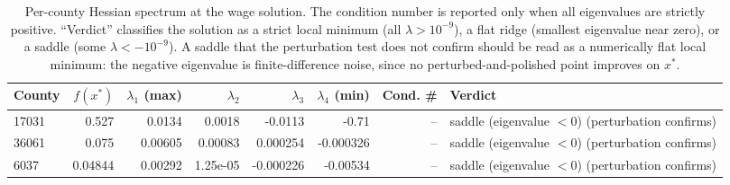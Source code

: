 \begin{table}[ht]
\centering
\caption{Per-county Hessian spectrum at the wage solution. The condition number is reported only when all eigenvalues are strictly positive. ``Verdict'' classifies the solution as a strict local minimum (all $\lambda > 10^{-9}$), a flat ridge (smallest eigenvalue near zero), or a saddle (some $\lambda < -10^{-9}$). A saddle that the perturbation test does not confirm should be read as a numerically flat local minimum: the negative eigenvalue is finite-difference noise, since no perturbed-and-polished point improves on $x^*$.} 
\label{tab:wage_hessian_spectrum}
\begin{tabular}{lrrrrrrl}
  \toprule
County & $f(x^*)$ & $\lambda_1$ (max) & $\lambda_2$ & $\lambda_3$ & $\lambda_4$ (min) & Cond. \# & Verdict \\ 
  \midrule
17031 & 0.527 & 0.0134 & 0.0018 & -0.0113 & -0.71 & -- & saddle (eigenvalue $<0$) (perturbation confirms) \\ 
  36061 & 0.075 & 0.00605 & 0.00083 & 0.000254 & -0.000326 & -- & saddle (eigenvalue $<0$) (perturbation confirms) \\ 
  6037 & 0.04844 & 0.00292 & 1.25e-05 & -0.000226 & -0.00534 & -- & saddle (eigenvalue $<0$) (perturbation confirms) \\ 
   \bottomrule
\end{tabular}
\end{table}
